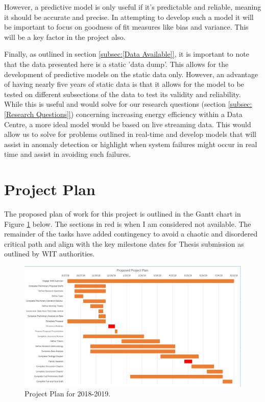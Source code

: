 \documentclass[12pt]{scrartcl}
\begin{document}
However, a predictive model is only useful if it's predictable and reliable, meaning it should be accurate and precise. In attempting to develop such a model it will be important to focus on goodness of fit measures like bias and variance. This will be a key factor in the project also.

Finally, as outlined in section \ref{subsec:[Data Available]}, it is important to note that the data presented here is a static 'data dump'. This allows for the development of predictive models on the static data only. However, an advantage of having nearly five years of static data is that it allows for the model to be tested on different subsections of the data to test its validity and reliability.  While this is useful and would solve for our research questions (section \ref{subsec:[Research Questions]}) concerning increasing energy efficiency within a Data Centre, a more ideal model would be based on live streaming data. This would allow us to solve for problems outlined in real-time and develop models that will assist in anomaly detection or highlight when system failures might occur in real time and assist in avoiding such failures.    

\section{Project Plan}
\label{sec:[Project Plan]}
The proposed plan of work for this project is outlined in the Gantt chart in Figure \ref{fig:projectplan} below. The sections in red is when I am considered not available. The remainder of the tasks have added contingency to avoid a chaotic and disordered critical path and align with the key milestone dates for Thesis submission as outlined by WIT authorities. 

\begin{figure}[h]
  \caption{Project Plan for 2018-2019.}
  \label{fig:projectplan}
  \centering
    \includegraphics[scale=0.45]{Gannt_Chart_schedule_of_work.png}
\end{figure}
\end{document}

